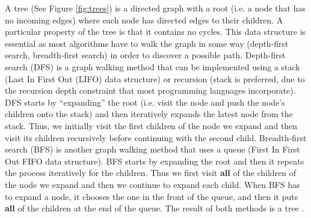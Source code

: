 A tree (See Figure \ref{fig:trees}) is a directed graph with a root (i.e. a node that has no incoming edges) where each node has directed edges to their children. A particular property of the tree is that it contains no cycles. This data structure is essential as most algorithms have to walk the graph in some way (depth-first search, breadth-first search) in order to discover a possible path. Depth-first search (DFS) \cite{Cormen:2009:IAT:1614191} is a graph walking method that can be implemented using a stack (Last In First Out (LIFO) data structure) or recursion (stack is preferred, due to the recursion depth constraint that most programming languages incorporate). DFS starts by “expanding” the root (i.e. visit the node and push the node’s children onto the stack) and then iteratively expands the latest node from the stack. Thus, we initially visit the first children of the node we expand and then visit its children recursively before continuing with the second child. Breadth-first search (BFS) \cite{Cormen:2009:IAT:1614191} is another graph walking method that uses a queue (First In First Out FIFO data structure). BFS starts by expanding the root and then it repeats the process iteratively for the children. Thus we first visit \textbf{all} of the children of the node we expand and then we continue to expand each child. When BFS has to expand a node, it chooses the one in the front of the queue, and then it puts \textbf{all} of the children at the end of the queue. The result of both methods is a tree \cite{choset2005principles}.

